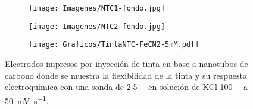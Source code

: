  	  			\begin{figure}[th]
		 	   	    \begin{subfigure}[t]{0.25\textwidth}
			       	\texttt{[image: Imagenes/NTC1-fondo.jpg]}
			   		\end{subfigure}
			   		\begin{subfigure}[t]{0.25\textwidth}
			       	\texttt{[image: Imagenes/NTC2-fondo.jpg]}
			   		\end{subfigure}
			   		\begin{subfigure}[t]{0.43\textwidth}
			   	    \texttt{[image: Graficos/TintaNTC-FeCN2-5mM.pdf]}
			   		\end{subfigure}
					 \caption[Electrodos de NTC flexibles.]{Electrodos impresos por inyección de tinta en base a nanotubos de carbono donde se muestra la flexibilidad de la tinta y su respuesta electroquímica con una sonda de \fe\space \SI{2.5}{\milli\Molar} en solución de KCl \SI{100}{\milli\Molar} a \SI{50}{\milli\volt\per\second}.}
					 \label{fig:tintas}	
				     \end{figure}


























